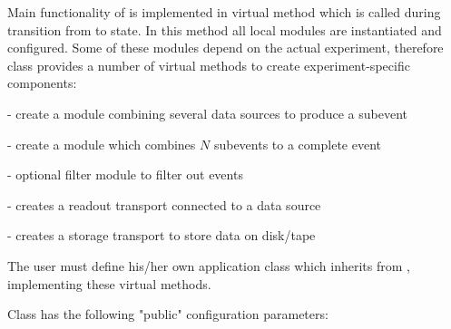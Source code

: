 Main functionality of  is implemented 
in virtual method  which is called during transition 
from  to  state. In this method all local modules are instantiated 
and configured. Some of these modules depend on the actual experiment, therefore 
class  provides a number of virtual methods
to create experiment-specific components:
\bbul
\item {}  - create a module combining several data sources to produce a subevent 
\item {}   - create a module which combines $N$ subevents to a complete event 
\item {}    - optional filter module to filter out events 
\item {}   - creates a readout transport connected to a data source
\item {}   - creates a storage transport to store data on disk/tape 
\ebul

The user  must define his/her own application class
which inherits from ,
implementing these virtual methods.


Class  has the following "public" 
configuration parameters:

